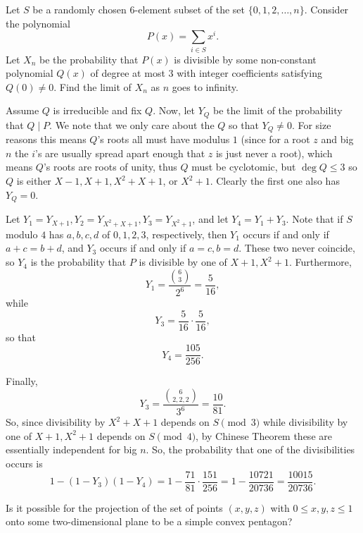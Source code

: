 \begin{question}[name={2018 HMMT, Algebra \& Number Theory, \href{https://artofproblemsolving.com/community/c129h1590239p9853149}{Problem 10}}]
	Let $S$ be a randomly chosen $6$-element subset of the set $\{0,1,2,\ldots,n\}.$ Consider the polynomial $$P(x)=\sum_{i\in S}x^i.$$ Let $X_n$ be the probability that $P(x)$ is divisible by some non-constant polynomial $Q(x)$ of degree at most $3$ with integer coefficients satisfying $Q(0) \neq 0.$ Find the limit of $X_n$ as $n$ goes to infinity.	
\end{question}




\begin{solution}[name={Solution by MathStudent2002}]
	Assume $Q$ is irreducible and fix $Q$. Now, let $Y_Q$ be the limit of the probability that $Q\mid P$. We note that we only care about the $Q$ so that $Y_Q\neq 0$. For size reasons this means $Q$'s roots all must have modulus $1$ (since for a root $z$ and big $n$ the $i$'s are usually spread apart enough that $z$ is just never a root), which means $Q$'s roots are roots of unity, thus $Q$ must be cyclotomic, but $\deg Q \leq 3$ so $Q$ is either $X-1, X+1, X^2+X+1$, or $X^2+1$. Clearly the first one also has $Y_Q = 0$.
	
	Let $Y_1 = Y_{X+1}, Y_2 = Y_{X^2+X+1}, Y_3 = Y_{X^2+1}$, and let $Y_4 = Y_1+Y_3$. Note that if $S$ modulo $4$ has $a,b,c,d$ of $0,1,2,3$, respectively, then $Y_1$ occurs if and only if $a+c = b+d$, and $Y_3$ occurs if and only if $a = c, b=d$. These two never coincide, so $Y_4$ is the probability that $P$ is divisible by one of $X+1, X^2+1$. Furthermore, $$Y_1 = \frac{\binom 63}{2^6} = \frac{5}{16},$$ while $$Y_3 = \frac{5}{16} \cdot \frac{5}{16},$$ so that $$Y_4 = \frac{105}{256}.$$
	
	Finally, $$Y_3 = \frac{\binom{6}{2,2,2}}{3^6} = \frac{10}{81}.$$ So, since divisibility by $X^2+X+1$ depends on $S\pmod 3$ while divisibility by one of $X+1, X^2+1$ depends on $S\pmod 4$, by Chinese Theorem these are essentially independent for big $n$. So, the probability that one of the divisibilities occurs is\[
	1-(1-Y_3)(1-Y_4) = 1 - \frac{71}{81}\cdot \frac{151}{256} = 1 - \frac{10721}{20736} = \boxed{\frac{10015}{20736}}.
	\]
\end{solution}





\begin{question}[name={2018 HMMT, Team, \href{https://artofproblemsolving.com/community/c129h1590292p9853489}{Problem 5}}]
	Is it possible for the projection of the set of points $(x, y, z)$ with $0 \leq x, y, z \leq 1$ onto some two-dimensional plane to be a simple convex pentagon?
\end{question}




